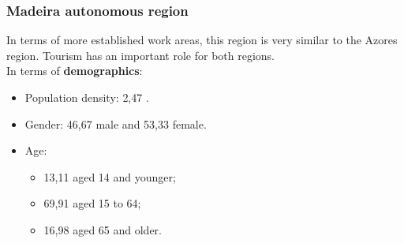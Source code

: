 \subsubsection{Madeira autonomous region }
In terms of more established work areas, this region is very similar to the Azores region. Tourism has an important role for both regions.\\
In terms of {\textbf{demographics}}:
    \begin{itemize}
        \item Population density: {2,47\textdiscount} . 
        \item Gender: {46,67\textdiscount} male and {53,33\textdiscount} female.
        \item Age: 
        \begin{itemize}
        \item {13,11\textdiscount} aged 14 and younger;
        \item {69,91\textdiscount} aged 15 to 64;
        \item {16,98\textdiscount} aged 65 and older.
        \end{itemize}
    \end{itemize}



